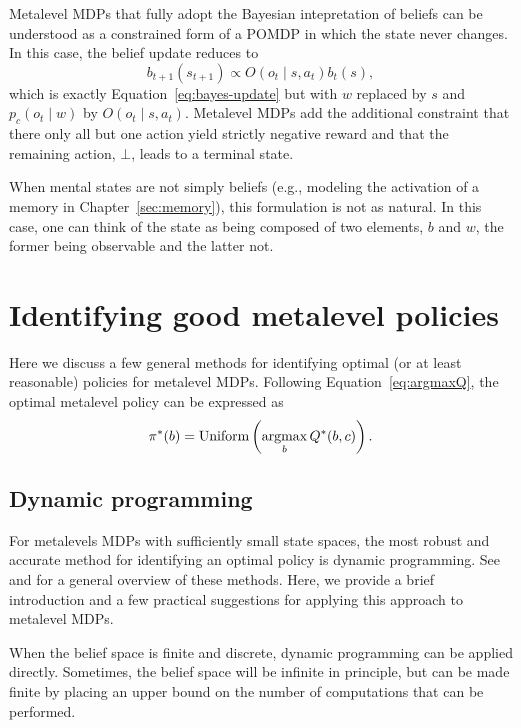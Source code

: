 Metalevel MDPs that fully adopt the Bayesian intepretation of beliefs can be understood as a constrained form of a POMDP in which the state never changes. In this case, the belief update reduces to
\begin{equation}\label{eq:pomdp-update}
  b_{t+1}(s_{t+1}) \propto 
  O(o_t \mid s, a_t) b_t(s),
\end{equation}
which is exactly Equation~\ref{eq:bayes-update} but with $w$ replaced by $s$ and $p_c(o_t \mid w)$ by $O(o_t \mid s, a_t)$. Metalevel MDPs add the additional constraint that there only all but one action yield strictly negative reward and that the remaining action, $\bot$, leads to a terminal state.

When mental states are not simply beliefs (e.g., modeling the activation of a memory in Chapter~\ref{sec:memory}), this formulation is not as natural. In this case, one can think of the state as being composed of two elements, $b$ and $w$, the former being observable and the latter not.

\section{Identifying good metalevel policies}\label{sec:computing}

Here we discuss a few general methods for identifying optimal (or at least reasonable) policies for metalevel MDPs. Following Equation~\ref{eq:argmaxQ}, the optimal metalevel policy can be expressed as
%
\begin{equation}
  \pi^*(b) = \text{Uniform}\left(\operatorname*{argmax}_b Q^*(b, c)\right).
\end{equation}


\subsection{Dynamic programming}\label{sec:backinduct}

For metalevels MDPs with sufficiently small state spaces, the most robust and accurate method for identifying an optimal policy is dynamic programming. See \citet{sutton2018reinforcement} and \citet{puterman2014markov} for a general overview of these methods. Here, we provide a brief introduction and a few practical suggestions for applying this approach to metalevel MDPs.


When the belief space is finite and discrete, dynamic programming can be applied directly. Sometimes, the belief space will be infinite in principle, but can be made finite by placing an upper bound on the number of computations that can be performed.





